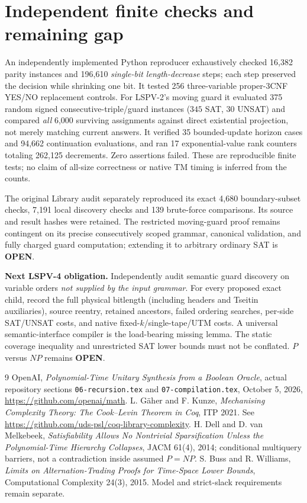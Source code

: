 \documentclass[11pt]{article}
\begin{document}
\section{Independent finite checks and remaining gap}
An independently implemented Python reproducer exhaustively checked 16,382 parity instances and 196,610 \emph{single-bit length-decrease} steps; each step preserved the decision while shrinking one bit. It tested 256 three-variable proper-3CNF YES/NO replacement controls. For LSPV-2's moving guard it evaluated 375 random signed consecutive-triple/guard instances ($345$ SAT, $30$ UNSAT) and compared \emph{all} 6,000 surviving assignments against direct existential projection, not merely matching current answers. It verified 35 bounded-update horizon cases and 94,662 continuation evaluations, and ran 17 exponential-value rank counters totaling 262,125 decrements. Zero assertions failed. These are reproducible finite tests; no claim of all-size correctness or native TM timing is inferred from the counts.

The original Library audit separately reproduced its exact 4,680 boundary-subset checks, 7,191 local discovery checks and 139 brute-force comparisons. Its source and result hashes were retained. The restricted moving-guard proof remains contingent on its precise consecutively scoped grammar, canonical validation, and fully charged guard computation; extending it to arbitrary ordinary SAT is \textbf{OPEN}.

\noindent\textbf{Next LSPV-4 obligation.} Independently audit semantic guard discovery on variable orders \emph{not supplied by the input grammar}. For every proposed exact child, record the full physical bitlength (including headers and Tseitin auxiliaries), source reentry, retained ancestors, failed ordering searches, per-side SAT/UNSAT costs, and native fixed-$k$/single-tape/UTM costs. A universal semantic-interface compiler is the load-bearing missing lemma. The static coverage inequality and unrestricted SAT lower bounds must not be conflated. $P$ versus $NP$ remains \textbf{OPEN}.

\begin{thebibliography}{9}
 OpenAI, \emph{Polynomial-Time Unitary Synthesis from a Boolean Oracle}, actual repository sections \texttt{06-recursion.tex} and \texttt{07-compilation.tex}, October 5, 2026, \url{https://github.com/openai/math}.
 L. G\"aher and F. Kunze, \emph{Mechanising Complexity Theory: The Cook--Levin Theorem in Coq}, ITP 2021. See \url{https://github.com/uds-psl/coq-library-complexity}.
 H. Dell and D. van Melkebeek, \emph{Satisfiability Allows No Nontrivial Sparsification Unless the Polynomial-Time Hierarchy Collapses}, JACM 61(4), 2014; conditional multiquery barriers, not a contradiction inside assumed $P=NP$.
 S. Buss and R. Williams, \emph{Limits on Alternation-Trading Proofs for Time-Space Lower Bounds}, Computational Complexity 24(3), 2015. Model and strict-slack requirements remain separate.
\end{thebibliography}
\end{document}
